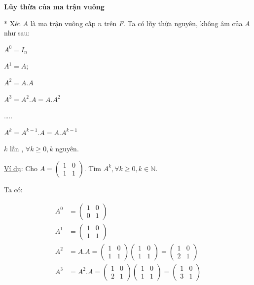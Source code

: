 \documentclass[12pt,a4paper]{article} \usepackage[utf8]{inputenc} \usepackage[T5]{fontenc} \usepackage[vietnamese]{babel} \usepackage{amsmath, amssymb, amsfonts} \usepackage{ulem}
\begin{document}
\textbf{Lũy thừa của ma trận vuông}

* Xét $A$ là ma
trận vuông cấp $n$ trên \emph{F}. Ta có lũy thừa nguyên, không âm của $A$ như sau:

$A^0 = I_n$

$A^1 = A$;

$A^2 = A.A$

$A^3 = A^2.A = A.A^2$

\ldots..

$A^k = A^{k-1}.A = A.A^{k-1}$

$k$ lần , $\forall k \ge 0, k$ nguyên.

\ul{Ví dụ}: Cho
$A = \begin{pmatrix} 1 & 0 \\ 1 & 1 \end{pmatrix}$. Tìm
$A^k, \forall k \ge 0, k \in \mathbb{N}$.

Ta có:

\begin{align*}
A^0 &= \begin{pmatrix} 1 & 0 \\ 0 & 1 \end{pmatrix} \\
A^1 &= \begin{pmatrix} 1 & 0 \\ 1 & 1 \end{pmatrix} \\
A^2 &= A.A = \begin{pmatrix} 1 & 0 \\ 1 & 1 \end{pmatrix} \begin{pmatrix} 1 & 0 \\ 1 & 1 \end{pmatrix} = \begin{pmatrix} 1 & 0 \\ 2 & 1 \end{pmatrix} \\
A^3 &= A^2.A = \begin{pmatrix} 1 & 0 \\ 2 & 1 \end{pmatrix} \begin{pmatrix} 1 & 0 \\ 1 & 1 \end{pmatrix} = \begin{pmatrix} 1 & 0 \\ 3 & 1 \end{pmatrix}
\end{align*}
\end{document}
